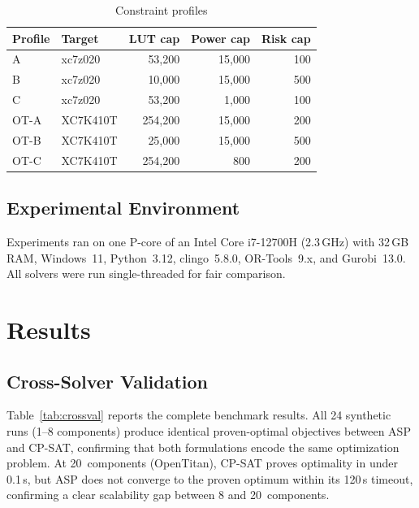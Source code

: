 \documentclass[conference]{IEEEtran}
\begin{document}
\begin{table}[t]
\caption{Constraint profiles}
\label{tab:profiles}
\centering
\footnotesize
\begin{tabular}{llrrr}
\toprule
Profile & Target & LUT cap & Power cap & Risk cap \\
\midrule
A    & xc7z020  &  53,200 & 15,000 & 100 \\
B    & xc7z020  &  10,000 & 15,000 & 500 \\
C    & xc7z020  &  53,200 &  1,000 & 100 \\
\midrule
OT-A & XC7K410T & 254,200 & 15,000 & 200 \\
OT-B & XC7K410T &  25,000 & 15,000 & 500 \\
OT-C & XC7K410T & 254,200 &    800 & 200 \\
\bottomrule
\end{tabular}
\end{table}

\subsection{Experimental Environment}

Experiments ran on one P-core of an Intel Core i7-12700H (2.3\,GHz)
with 32\,GB RAM, Windows~11, Python~3.12, clingo~5.8.0,
OR-Tools~9.x, and Gurobi~13.0. All solvers were run single-threaded
for fair comparison.

\section{Results}
\label{sec:results}

\subsection{Cross-Solver Validation}

Table~\ref{tab:crossval} reports the complete benchmark results. All 24
synthetic runs (1--8 components) produce identical proven-optimal
objectives between ASP and CP-SAT, confirming that both formulations
encode the same optimization problem. At 20~components (OpenTitan),
CP-SAT proves optimality in under 0.1\,s, but ASP does not converge
to the proven optimum within its 120\,s timeout, confirming a
clear scalability gap between 8 and 20~components.
\end{document}
